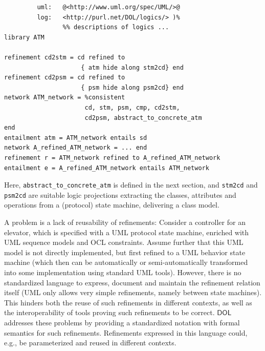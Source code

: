 \documentclass[10pt, a4paper]{isov2}
\newcommand*{\DOL}{\ensuremath{\mathsf{DOL}}\xspace}
\begin{document}
\begin{lstlisting}[basicstyle=\ttfamily,language=dolText,escapechar=@,mathescape]
%prefix( :      <http://www.example.org/uml/>
         uml:   @<http://www.uml.org/spec/UML/>@
         log:   <http://purl.net/DOL/logics/> )%
                %% descriptions of logics ...
library ATM

refinement cd2stm = cd refined to 
                     { atm hide along stm2cd} end
refinement cd2psm = cd refined to 
                     { psm hide along psm2cd} end
network ATM_network = %consistent
                      cd, stm, psm, cmp, cd2stm, 
                      cd2psm, abstract_to_concrete_atm
end
entailment atm = ATM_network entails sd
network A_refined_ATM_network = ... end
refinement r = ATM_network refined to A_refined_ATM_network
entailment e = A_refined_ATM_network entails ATM_network
\end{lstlisting}
Here, \texttt{abstract\_to\_concrete\_atm} is defined in the next
section, and \texttt{stm2cd} and \texttt{psm2cd} are suitable logic
projections extracting the classes, attributes and operations from a
(protocol) state machine, delivering a class model.



\label{model-2}

A problem is a lack of reusability of refinements: Consider a controller for an elevator, which is specified with a UML protocol state machine, enriched with UML
sequence models and OCL constraints. Assume further that this UML model is not directly implemented, but first refined to a UML behavior state machine (which then
can be automatically or semi-automatically transformed into some implementation using standard UML tools). However, there is no standardized language to
express, document and maintain the refinement relation itself (UML only allows very simple refinements, namely between state machines). This hinders both the
reuse of such refinements in different contexts, as well as the interoperability of tools proving such refinements to be correct. \DOL
addresses these problems by providing a standardized notation with formal semantics for such refinements. Refinements expressed in this language could, e.g., be
parameterized and reused in different contexts.
\end{document}
